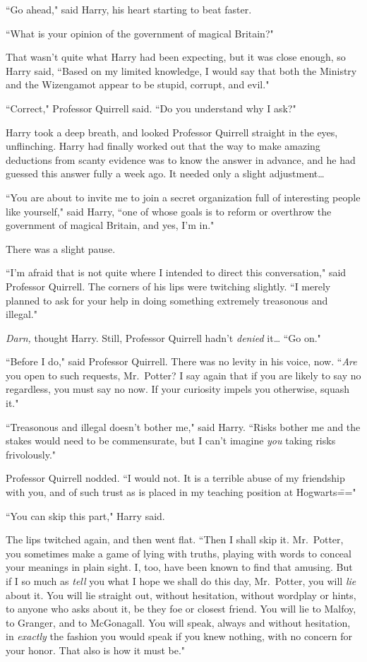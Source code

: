 ``Go ahead," said Harry, his heart starting to beat faster.

``What is your opinion of the government of magical Britain?"

That wasn't quite what Harry had been expecting, but it was close enough, so Harry said, ``Based on my limited knowledge, I would say that both the Ministry and the Wizengamot appear to be stupid, corrupt, and evil."

``Correct," Professor Quirrell said. ``Do you understand why I ask?"

Harry took a deep breath, and looked Professor Quirrell straight in the eyes, unflinching. Harry had finally worked out that the way to make amazing deductions from scanty evidence was to know the answer in advance, and he had guessed this answer fully a week ago. It needed only a slight adjustment{\ldots}

``You are about to invite me to join a secret organization full of interesting people like yourself," said Harry, ``one of whose goals is to reform or overthrow the government of magical Britain, and yes, I'm in."

There was a slight pause.

``I'm afraid that is not quite where I intended to direct this conversation," said Professor Quirrell. The corners of his lips were twitching slightly. ``I merely planned to ask for your help in doing something extremely treasonous and illegal."

\emph{Darn,} thought Harry. Still, Professor Quirrell hadn't \emph{denied} it{\ldots} ``Go on."

``Before I do," said Professor Quirrell. There was no levity in his voice, now. ``\emph{Are} you open to such requests, Mr.~Potter? I say again that if you are likely to say no regardless, you must say no now. If your curiosity impels you otherwise, squash it."

``Treasonous and illegal doesn't bother me," said Harry. ``Risks bother me and the stakes would need to be commensurate, but I can't imagine \emph{you} taking risks frivolously."

Professor Quirrell nodded. ``I would not. It is a terrible abuse of my friendship with you, and of such trust as is placed in my teaching position at Hogwarts\==="

``You can skip this part," Harry said.

The lips twitched again, and then went flat. ``Then I shall skip it. Mr.~Potter, you sometimes make a game of lying with truths, playing with words to conceal your meanings in plain sight. I, too, have been known to find that amusing. But if I so much as \emph{tell} you what I hope we shall do this day, Mr.~Potter, you will \emph{lie} about it. You will lie straight out, without hesitation, without wordplay or hints, to anyone who asks about it, be they foe or closest friend. You will lie to Malfoy, to Granger, and to McGonagall. You will speak, always and without hesitation, in \emph{exactly} the fashion you would speak if you knew nothing, with no concern for your honor. That also is how it must be."


